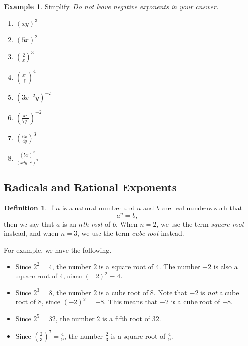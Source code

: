 \documentclass[letterpaper,12pt,oneside]{book}
\theoremstyle{definition}
\newtheorem{definition}[theorem]{Definition}
\newtheorem{example}[theorem]{Example}
\begin{document}
\begin{example}
Simplify.  \emph{Do not leave negative exponents in your answer.}
\begin{multicols*}{2}
\begin{enumerate}
\item $(xy)^3$
\vfill\null
\item $(5x)^2$
\vfill\null
\item $\displaystyle\left(\frac{2}{x}\right)^3$
\vfill\null
\item $\displaystyle\left(\frac{x^2}{y}\right)^4$
\vfill\null
\columnbreak
\item $\displaystyle\left(3x^{-2}y\right)^{-2}$
\vfill\null
\item $\displaystyle\left(\frac{x^2}{7y^5}\right)^{-2}$
\vfill\null
\item $\displaystyle\left(\frac{6x}{4y}\right)^3$
\vfill\null
\item $\displaystyle\frac{(5x)^2}{(x^2y^{-2})^3}$
\vfill\null
\end{enumerate}
\end{multicols*}
\end{example}

\newpage

\noindent 
\subsection*{Radicals and Rational Exponents}

\begin{definition}
If $n$ is a natural number and $a$ and $b$ are real numbers such that 
\[
a^n=b,
\]
then we say that $a$ is an \emph{$n$th root} of $b$.  When $n=2$, we use the term \emph{square root} instead, and when $n=3$, we use the term \emph{cube root} instead.
\end{definition}


\noindent
For example, we have the following.
\begin{itemize}
\item Since $2^2=4$, the number $2$ is a square root of $4$.  The number $-2$ is also a square root of $4$, since $(-2)^2=4$.
\item Since $2^3=8$, the number $2$ is a cube root of $8$.  Note that $-2$ is \emph{not} a cube root of $8$, since $(-2)^3=-8$.  This means that $-2$ is a cube root of $-8$.
\item Since $2^5=32$, the number $2$ is a fifth root of $32$.
\item Since $\left(\tfrac{2}{3}\right)^2=\tfrac{4}{9}$, the number $\tfrac{2}{3}$ is a square root of $\tfrac{4}{9}$.
\end{itemize}
\end{document}
